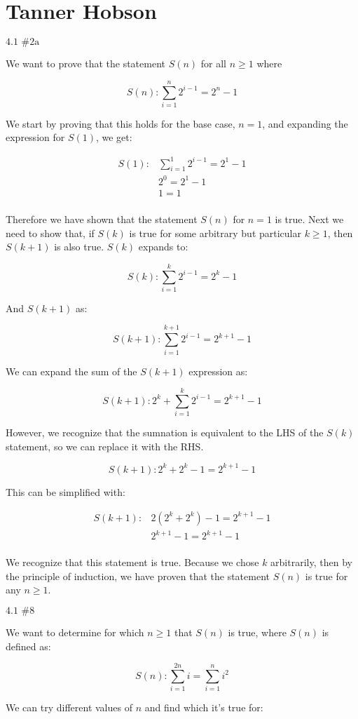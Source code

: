 \documentclass{article}
\newcommand{\problem}[2]{$\boxed{\text{#1 \##2}}$}
\newcommand{\multistep}[1]{\begin{array}{rl} #1 \end{array}}
\begin{document}
\section*{Tanner Hobson}

%
\problem{4.1}{2a}

We want to prove that the statement $S(n)$ for all $n\ge1$ where

\[
S(n): \sum\limits_{i=1}^n 2^{i-1}=2^n - 1
\]

We start by proving that this holds for the base case, $n=1$, and
expanding the expression for $S(1)$, we get:

\[
\multistep{
S(1):&\sum\limits_{i=1}^1 2^{i-1}=2^1-1 \\
&2^0=2^1-1 \\
&1=1 \\
}
\]

Therefore we have shown that the statement $S(n)$ for $n=1$ is
true. Next we need to show that, if $S(k)$ is true for some arbitrary
but particular $k\ge1$, then $S(k+1)$ is also true. $S(k)$ expands to:

\[
S(k):\sum\limits_{i=1}^k 2^{i-1}=2^k-1
\]

And $S(k+1)$ as:

\[
S(k+1):\sum\limits_{i=1}^{k+1} 2^{i-1}=2^{k+1}-1
\]

We can expand the sum of the $S(k+1)$ expression as:

\[
S(k+1):2^k+\sum\limits_{i=1}^k 2^{i-1}=2^{k+1}-1
\]

However, we recognize that the sumnation is equivalent to the LHS of
the $S(k)$ statement, so we can replace it with the RHS.

\[
S(k+1):2^k+2^k-1=2^{k+1}-1
\]

This can be simplified with:

\[
\multistep{
S(k+1):&2(2^k+2^k)-1=2^{k+1}-1 \\
&2^{k+1}-1=2^{k+1}-1 \\
}
\]

We recognize that this statement is true. Because we chose $k$
arbitrarily, then by the principle of induction, we have proven that
the statement $S(n)$ is true for any $n\ge1$.

%
\problem{4.1}{8}

We want to determine for which $n\ge1$ that $S(n)$ is true, where
$S(n)$ is defined as:

\[
S(n):\sum\limits_{i=1}^{2n} i=\sum\limits_{i=1}^n i^2
\]

We can try different values of $n$ and find which it's true for:
\end{document}
